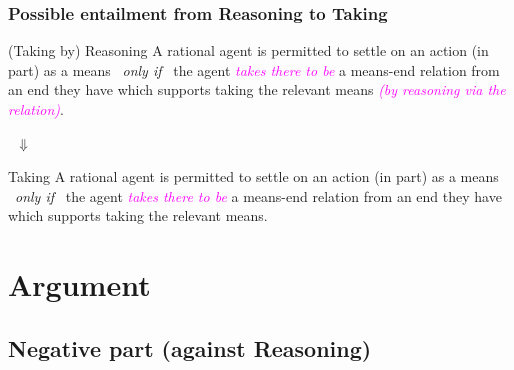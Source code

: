 \documentclass[noamssymb,
graphics,
]{beamer} %
\newcommand{\schemaName}[1]{\textsf{#1}}
\begin{document}
\begin{frame}
  \frametitle{Possible entailment from \schemaName{Reasoning} to \schemaName{Taking}}

  \begin{block}{(Taking by) Reasoning}
   A rational agent is permitted to settle on an action (in part) as a means
    \newline
    \mbox{ }\hfill\emph{only if}\hfill\mbox{ }
    \newline
    the agent \textcolor{fuchsia}{\emph{takes there to be}}  a means-end relation from an end they have which supports taking the relevant means \textcolor{fuchsia}{\emph{(by reasoning via the relation)}}.
  \end{block}

  {\Large \mbox{ }\hfill\(\Downarrow\)\hfill\mbox{ }}

  \begin{block}{Taking}
    A rational agent is permitted to settle on an action (in part) as a means
    \newline
    \mbox{ }\hfill\emph{only if}\hfill\mbox{ }
    \newline
    the agent \textcolor{fuchsia}{\emph{takes there to be}} a means-end relation from an end they have which supports taking the relevant means.
  \end{block}

\end{frame}


\section{Argument}
\label{sec:argument}


\subsection{Negative part (against \schemaName{Reasoning})}
\label{sec:negative}
\end{document}
